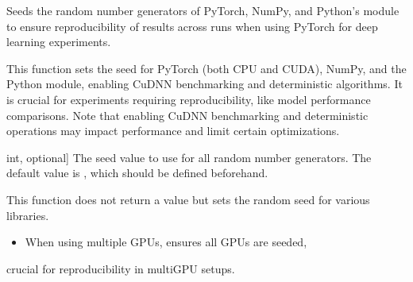 \documentclass[letterpaper,10pt,english]{sphinxmanual}
\begin{document}
\begin{fulllineitems}
\label{\detokenize{utils:utils.seed_torch}}
\pysigstartsignatures
{}
\pysigstopsignatures
\sphinxAtStartPar
Seeds the random number generators of PyTorch, NumPy, and Python’s  module to ensure
reproducibility of results across runs when using PyTorch for deep learning experiments.

\sphinxAtStartPar
This function sets the seed for PyTorch (both CPU and CUDA), NumPy, and the Python  module,
enabling CuDNN benchmarking and deterministic algorithms. It is crucial for experiments requiring
reproducibility, like model performance comparisons. Note that enabling CuDNN benchmarking and
deterministic operations may impact performance and limit certain optimizations.
\begin{description}
\begin{description}
\sphinxlineitem{seed}{[}int, optional{]}
\sphinxAtStartPar
The seed value to use for all random number generators. The default value is , which
should be defined beforehand.

\end{description}

\begin{description}
\sphinxAtStartPar
This function does not return a value but sets the random seed for various libraries.

\end{description}

\begin{itemize}
\item {} 
\sphinxAtStartPar
When using multiple GPUs,  ensures all GPUs are seeded,

\end{itemize}

\sphinxAtStartPar
crucial for reproducibility in multi\sphinxhyphen{}GPU setups.

\begin{sphinxVerbatim}[commandchars=\\\{\}]
  
\end{sphinxVerbatim}

\end{description}

\end{fulllineitems}
\end{document}
